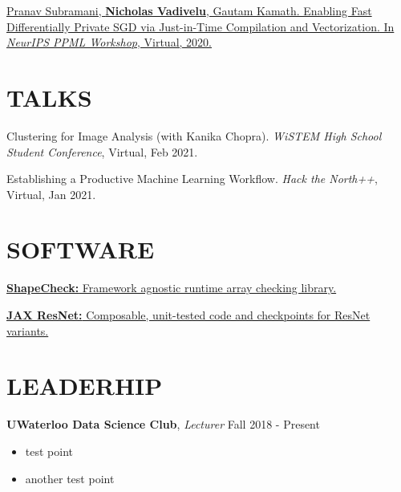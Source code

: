 \documentclass[line,margin]{res}
\newcommand{\experience}[3]{\textbf{#1}, \textit{#2} \hfill #3 \\ \vspace{-4mm}}
\newcommand{\paper}[6]{\href{#6}{#1. #2. In \textit{#3}, #4, #5.}}
\newcommand{\software}[3]{\href{#3}{\textbf{#1: } #2.}\vspace{-2mm}}
\newcommand{\talk}[4]{#1. \textit{#2}, #3, #4. \vspace{-2mm}}
\begin{document}
\begin{resume}
    \paper
    {Pranav Subramani, \textbf{Nicholas Vadivelu}, Gautam Kamath}
    {Enabling Fast Differentially Private SGD via Just-in-Time Compilation and Vectorization}
    {\textit{NeurIPS PPML Workshop}}{Virtual}{2020}
    {https://arxiv.org/abs/2010.09063}

\section{TALKS}
    \talk
    {Clustering for Image Analysis (with Kanika Chopra)}
    {WiSTEM High School Student Conference}{Virtual}{Feb 2021}

    \talk
    {Establishing a Productive Machine Learning Workflow}
    {Hack the North++}{Virtual}{Jan 2021}

\section{SOFTWARE}
    \software{ShapeCheck}{Framework agnostic runtime array checking library}
    {https://github.com/n2cholas/jax-resnet}

    \software
    {JAX ResNet}{Composable, unit-tested code and checkpoints for ResNet variants}
    {https://pypi.org/project/shapecheck/}

\section{LEADERHIP}
    \experience{UWaterloo Data Science Club}{Lecturer}{Fall 2018 - Present}
    \begin{itemize}
        \item test point
        \item another test point
    \end{itemize}

\end{resume}
\end{document}
